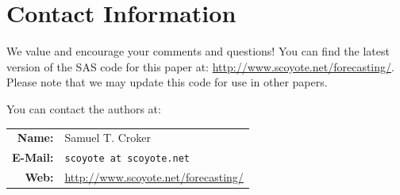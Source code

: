\documentclass[10pt]{sugconf-ish}
\begin{document}



\newpage
\section{Contact Information}
We value and encourage your comments and questions! You can find the latest version of the SAS code for this paper at: \url{http://www.scoyote.net/forecasting/}. Please note that we may update this code for use in other papers.

You can contact the authors at:

\begin{tabular}[t]{rl}
\textbf{Name:} & Samuel T. Croker \\
\textbf{E-Mail:} & \texttt{scoyote at scoyote.net} \\
\textbf{Web:} & \url{http://www.scoyote.net/forecasting/} \\
 \end{tabular}


\vfill
\SASisRegisteredTrademark\ \OtherTrademarks
\end{document}
